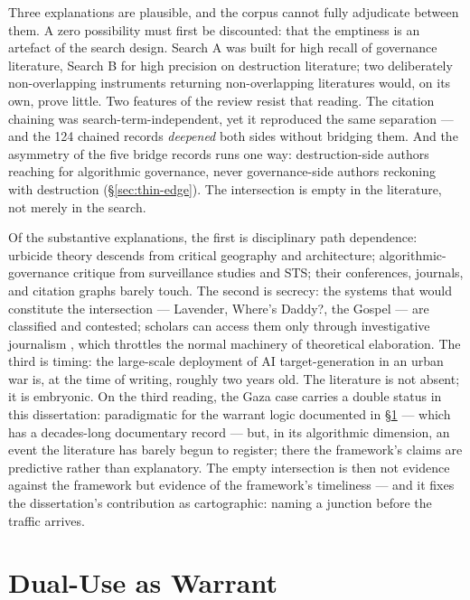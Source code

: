 Three explanations are plausible, and the corpus cannot fully adjudicate between them. A zero possibility must first be discounted: that the emptiness is an artefact of the search design. Search A was built for high recall of governance literature, Search B for high precision on destruction literature; two deliberately non-overlapping instruments returning non-overlapping literatures would, on its own, prove little. Two features of the review resist that reading. The citation chaining was search-term-independent, yet it reproduced the same separation — and the 124 chained records \emph{deepened} both sides without bridging them. And the asymmetry of the five bridge records runs one way: destruction-side authors reaching for algorithmic governance, never governance-side authors reckoning with destruction (§\ref{sec:thin-edge}). The intersection is empty in the literature, not merely in the search.

Of the substantive explanations, the first is disciplinary path dependence: urbicide theory descends from critical geography and architecture; algorithmic-governance critique from surveillance studies and STS; their conferences, journals, and citation graphs barely touch. The second is secrecy: the systems that would constitute the intersection — Lavender, Where's Daddy?, the Gospel — are classified and contested; scholars can access them only through investigative journalism \parencite{hourani2024}, which throttles the normal machinery of theoretical elaboration. The third is timing: the large-scale deployment of AI target-generation in an urban war is, at the time of writing, roughly two years old. The literature is not absent; it is embryonic. On the third reading, the Gaza case carries a double status in this dissertation: paradigmatic for the warrant logic documented in §\ref{sec:dual-use-warrant} — which has a decades-long documentary record — but, in its algorithmic dimension, an event the literature has barely begun to register; there the framework's claims are predictive rather than explanatory. The empty intersection is then not evidence against the framework but evidence of the framework's timeliness — and it fixes the dissertation's contribution as cartographic: naming a junction before the traffic arrives.

\section{Dual-Use as Warrant}
\label{sec:dual-use-warrant}

